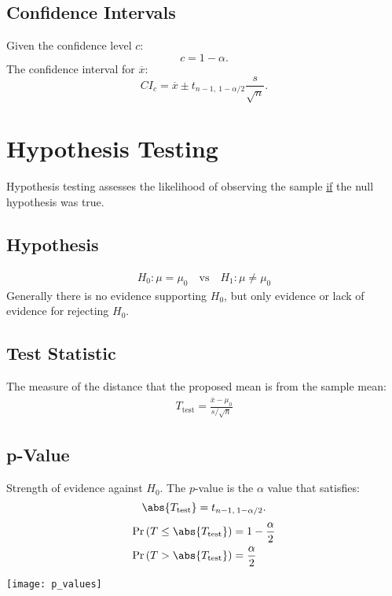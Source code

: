 \documentclass{article}
\begin{document}
\begin{minipage}{126.1962963mm}
    \begin{multicols*}{2}
        \subsection*{Confidence Intervals}
        Given the confidence level $c$:
        \begin{equation*}
            c = 1 - \alpha.
        \end{equation*}
        The confidence interval for $\overline{x}$:
        \begin{equation*}
            {CI}_{c} = \overline{x} \pm t_{n-1,\: 1-\alpha/2} \frac{s}{\sqrt{n}}.
        \end{equation*}
        \section*{Hypothesis Testing}
        Hypothesis testing assesses the likelihood of observing the sample \underline{if} the null hypothesis was true.
        \subsection*{Hypothesis}
        \begin{align*}
            H_0:\mu = \mu_0 \quad \text{vs} \quad H_1:\mu \neq \mu_0
        \end{align*}
        Generally there is no evidence supporting $H_0$, but only evidence or lack of evidence for rejecting $H_0$.
        \subsection*{Test Statistic}
        The measure of the distance that the proposed mean is from the sample mean:
        \begin{align*}
            T_{\text{test}} = \frac{\overline{x} - \mu_0}{s/\sqrt{n}}
        \end{align*}
        \subsection*{p-Value}
        Strength of evidence against $H_0$. The $p$-value is the $\alpha$ value that satisfies:
        \begin{equation*}
            \abs{T_{\text{test}}} = t_{n-1,\: 1-\alpha/2}.
        \end{equation*}
        \begin{align*}
            \Pr{\left( T \leq \abs{T_{\text{test}}} \right)} & = 1 - \frac{\alpha}{2} \\
            \Pr{\left( T > \abs{T_{\text{test}}} \right)}    & = \frac{\alpha}{2}
        \end{align*}
    \end{multicols*}
    \texttt{[image: p\_values]}
\end{minipage}
\end{document}
